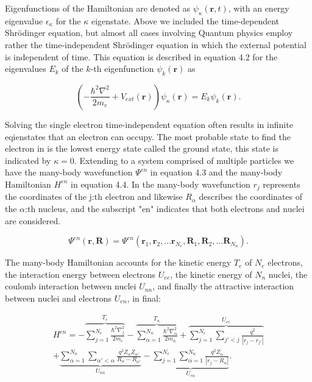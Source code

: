 Eigenfunctions of the Hamiltonian are denoted as $\psi_{\kappa}(\boldsymbol{r}, t)$, with an energy eigenvalue $\epsilon_{\kappa}$ for the $\kappa$ eigenstate. Above we included the time-dependent Shr\"{o}dinger equation, but almost all cases involving Quantum physics employ rather the time-independent Shr\"{o}dinger equation in which the external potential is independent of time. This equation is described in equation 4.2 for the eigenvalues $E_k$ of the $k$-th eigenfunction $\psi_k(\boldsymbol{r})$ as

\begin{equation}
	\left(-\frac{\hbar^2\nabla^2}{2m_e} + V_{ext}(\boldsymbol{r}) \right)\psi_{\kappa}(\boldsymbol{r}) = E_k \psi_k(\boldsymbol{r}).
\end{equation}

Solving the single electron time-independent equation often results in infinite eqienstates that an electron can occupy. The most probable state to find the electron in is the lowest energy state called the ground state, this state is indicated by $\kappa = 0$. Extending to a system comprised of multiple particles we have the many-body wavefunction $\Psi^{en}$ in equation 4.3 and the many-body Hamiltonian $H^{en}$ in equation 4.4. In the many-body wavefunction $r_j$ represents the coordinates of the j:th electron and likewise $R_{\alpha}$ describes the coordinates of the $\alpha$:th nucleus, and the subscript "en" indicates that both electrons and nuclei are considered.

\begin{equation}
\Psi^{en}(\boldsymbol{r}, \boldsymbol{R}) = \Psi^{en}(\boldsymbol{r}_1 , \boldsymbol{r}_2, \dots \boldsymbol{r}_{N_e}, \boldsymbol{R}_1, \boldsymbol{R}_2, \dots \boldsymbol{R}_{N_n}).
\end{equation}

The many-body Hamiltonian accounts for the kinetic energy $T_e$ of $N_e$ electrons, the interaction energy between electrons $U_{ee}$, the kinetic energy of $N_n$ nuclei, the coulomb interaction between nuclei $U_{nn}$, and finally the attractive interaction between nuclei and electrons $U_{en}$, in final:

\begin{equation}
    \begin{split}
       H^{en} = -\overbrace{\sum_{j=1}^{N_e}\frac{\hbar^2\nabla_j ^2}{2m_e}}^{T_e} - \overbrace{\sum_{\alpha=1}^{N_n}\frac{\hbar^2 \nabla_\alpha ^2}{2m_n}}^{T_n} + \overbrace{\sum_{j=1}^{N_e}\sum_{j'<j}\frac{q^2}{|r_j - r_{j'}|}}^{U_{ee}} \\
    + \underbrace{\sum_{\alpha=1}^{N_n}\sum_{\alpha' < \alpha}\frac{q^2Z_\alpha Z_{\alpha'}}{R_\alpha - R_{\alpha'}}}_{U_{nn}} -\underbrace{\sum_{j=1}^{N_e}\sum_{\alpha=1}^{N_n}\frac{q^2Z_\alpha}{|r_j - R_\alpha|}}_{U_{en}}.
    \end{split}
\end{equation} 
 

